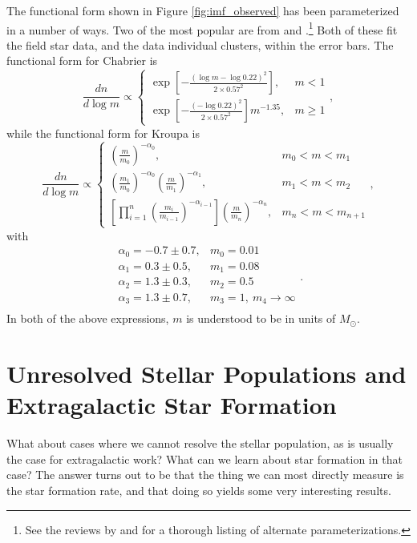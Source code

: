 The functional form shown in Figure \ref{fig:imf_observed} has been parameterized in a number of ways. Two of the most popular are from \citet{kroupa01a, kroupa02c} and \citet{chabrier03a, chabrier05a}.\footnote{See the reviews by \citet{bastian10a} and \citet{offner14a} for a thorough listing of alternate parameterizations.}  Both of these fit the field star data, and the data individual clusters, within the error bars. The functional form for Chabrier is
\begin{equation}
\label{eq:chabrier}
\frac{dn}{d\log m} \propto 
\left\{
\begin{array}{ll}
\exp\left[-\frac{(\log m-\log 0.22)^2}{2\times 0.57^2}\right], &
m<1 \\
\exp\left[-\frac{(-\log 0.22)^2}{2\times 0.57^2}\right] m^{-1.35}, &
m\ge 1
\end{array}
\right.,
\end{equation}
while the functional form for Kroupa is
\begin{equation}
\label{eq:kroupa}
\frac{dn}{d\log m} \propto
\left\{
\begin{array}{ll}
\left(\frac{m}{m_0}\right)^{-\alpha_0}, & m_0 < m < m_1\\
\left(\frac{m_1}{m_0}\right)^{-\alpha_0} \left(\frac{m}{m_1}\right)^{-\alpha_1}, &
m_1 < m < m_2 \\
\left[\prod_{i=1}^{n} \left(\frac{m_i}{m_{i-1}}\right)^{-\alpha_{i-1}}\right] \left(\frac{m}{m_n}\right)^{-\alpha_n}, &
m_{n} < m < m_{n+1}
\end{array}
\right.,
\end{equation}
with
\begin{equation}
\begin{array}{ll}
\alpha_0 = -0.7\pm 0.7, & m_0 = 0.01 \\
\alpha_1 = 0.3\pm 0.5, & m_1 = 0.08 \\
\alpha_2 = 1.3\pm 0.3, & m_2 = 0.5 \\
\alpha_3 = 1.3\pm 0.7, & m_3 = 1,~m_4 \to \infty \\
\end{array}.
\end{equation}
In both of the above expressions, $m$ is understood to be in units of $M_\odot$.

\section{Unresolved Stellar Populations and Extragalactic Star Formation}

What about cases where we cannot resolve the stellar population, as is usually the case for extragalactic work? What can we learn about star formation in that case? The answer turns out to be that the thing we can most directly measure is the star formation rate, and that doing so yields some very interesting results.

